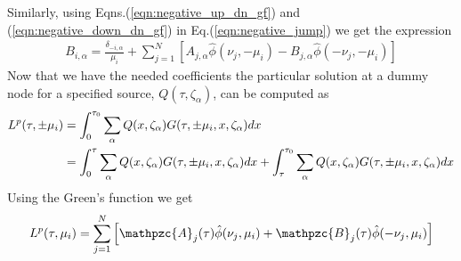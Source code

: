 \documentclass[11pt]{article}
\newcommand{\eqr}[1]{Eq.\thinspace(#1)}
\newcommand{\script}[1]{\mathpzc{#1}}
\begin{document}
Similarly, using Eqns.\thinspace(\ref{eqn:negative_up_dn_gf}) and
(\ref{eqn:negative_down_dn_gf}) in \eqr{\ref{eqn:negative_jump}} we
get the expression
\begin{align}
  B_{i,\alpha} =
  \frac{\delta_{-i,\alpha}}{\mu_i}
  +
  \sum_{j=1}^N
  \left[
     A_{j,\alpha} \hat{\phi}(\nu_j,-\mu_i)
    - B_{j,\alpha} \hat{\phi}(-\nu_j,-\mu_i)
 \right]
\end{align}
Now that we have the needed coefficients the particular solution at a
dummy node for a specified source, $Q(\tau,\zeta_\alpha)$, can be
computed as
\begin{align}
  L^p(\tau,\pm\mu_i) 
  &= 
  \int_0^{\tau_0}
  \sum_\alpha
  Q(x,\zeta_\alpha)
  G(\tau,\pm\mu_i,x,\zeta_\alpha)
  dx \notag \\
  &=
  \int_0^{\tau}
  \sum_\alpha
  Q(x,\zeta_\alpha)
  G(\tau,\pm\mu_i,x,\zeta_\alpha)
  dx
  +
  \int_\tau^{\tau_0}
  \sum_\alpha
  Q(x,\zeta_\alpha)
  G(\tau,\pm\mu_i,x,\zeta_\alpha)
  dx
\end{align}
Using the Green's function we get
\begin{align}
  L^p(\tau,\mu_i) = 
  \sum_{j=1}^N
  \left[
    \script{A}_j(\tau) \hat{\phi}(\nu_j,\mu_i) +
    \script{B}_j(\tau) \hat{\phi}(-\nu_j,\mu_i)
  \right]
\end{align}
\end{document}
